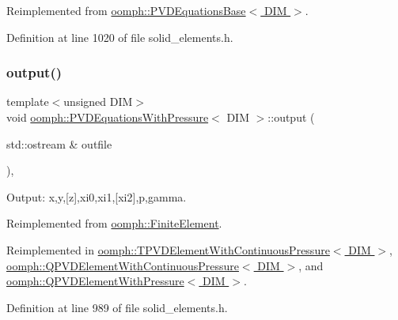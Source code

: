 Reimplemented from \hyperlink{classoomph_1_1PVDEquationsBase_a749f42fea2b7138a61193c2615b2d95c}{oomph\+::\+P\+V\+D\+Equations\+Base$<$ D\+I\+M $>$}.



Definition at line 1020 of file solid\+\_\+elements.\+h.

\mbox{\label{classoomph_1_1PVDEquationsWithPressure_a1853eace3f079f90cc34df8029bd3dba}} 
\subsubsection{\texorpdfstring{output()}{output()}\hspace{0.1cm}{\footnotesize\ttfamily [1/4]}}
{\footnotesize\ttfamily template$<$unsigned D\+IM$>$ \\
void \hyperlink{classoomph_1_1PVDEquationsWithPressure}{oomph\+::\+P\+V\+D\+Equations\+With\+Pressure}$<$ D\+IM $>$\+::output (\begin{DoxyParamCaption}\item[{std\+::ostream \&}]{outfile }\end{DoxyParamCaption})\hspace{0.3cm}{\ttfamily [inline]}, {\ttfamily [virtual]}}



Output\+: x,y,\mbox{[}z\mbox{]},xi0,xi1,\mbox{[}xi2\mbox{]},p,gamma. 



Reimplemented from \hyperlink{classoomph_1_1FiniteElement_a2ad98a3d2ef4999f1bef62c0ff13f2a7}{oomph\+::\+Finite\+Element}.



Reimplemented in \hyperlink{classoomph_1_1TPVDElementWithContinuousPressure_a33bc9dab61e60a0de1cb784020c5f056}{oomph\+::\+T\+P\+V\+D\+Element\+With\+Continuous\+Pressure$<$ D\+I\+M $>$}, \hyperlink{classoomph_1_1QPVDElementWithContinuousPressure_acc858925ae5724c02fc1073130f67430}{oomph\+::\+Q\+P\+V\+D\+Element\+With\+Continuous\+Pressure$<$ D\+I\+M $>$}, and \hyperlink{classoomph_1_1QPVDElementWithPressure_a442248cc27256d32e674ab2ffc1aa032}{oomph\+::\+Q\+P\+V\+D\+Element\+With\+Pressure$<$ D\+I\+M $>$}.



Definition at line 989 of file solid\+\_\+elements.\+h.



